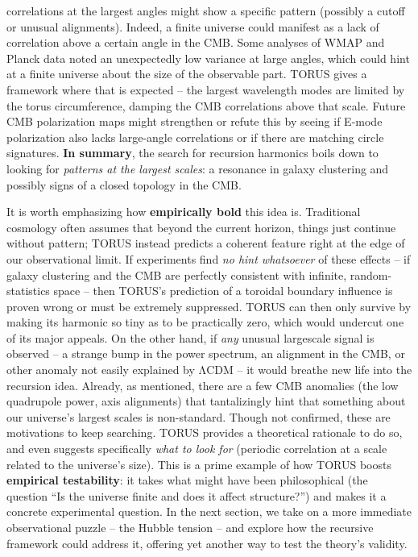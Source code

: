 correlations at the largest angles might show a specific pattern
(possibly a cutoff or unusual alignments). Indeed, a finite universe
could manifest as a lack of correlation above a certain angle in the
CMB. Some analyses of WMAP and Planck data noted an unexpectedly low
variance at large angles, which could hint at a finite universe about
the size of the observable part. TORUS gives a framework where that is
expected -- the largest wavelength modes are limited by the torus
circumference, damping the CMB correlations above that scale. Future CMB
polarization maps might strengthen or refute this by seeing if E-mode
polarization also lacks large-angle correlations or if there are
matching circle signatures. \textbf{In summary}, the search for
recursion harmonics boils down to looking for \emph{patterns at the
largest scales}: a resonance in galaxy clustering and possibly signs of
a closed topology in the CMB.

It is worth emphasizing how \textbf{empirically bold} this idea is.
Traditional cosmology often assumes that beyond the current horizon,
things just continue without pattern; TORUS instead predicts a coherent
feature right at the edge of our observational limit. If experiments
find \emph{no hint whatsoever} of these effects -- if galaxy clustering
and the CMB are perfectly consistent with infinite, random-statistics
space -- then TORUS's prediction of a toroidal boundary influence is
proven wrong or must be extremely suppressed​. TORUS can then only
survive by making its harmonic so tiny as to be practically zero, which
would undercut one of its major appeals. On the other hand, if
\emph{any} unusual largescale signal is observed -- a strange bump in
the power spectrum, an alignment in the CMB, or other anomaly not easily
explained by ΛCDM -- it would breathe new life into the recursion idea.
Already, as mentioned, there are a few CMB anomalies (the low quadrupole
power, axis alignments) that tantalizingly hint that something about our
universe's largest scales is non-standard​. Though not confirmed, these
are motivations to keep searching. TORUS provides a theoretical
rationale to do so, and even suggests specifically \emph{what to look
for} (periodic correlation at a scale related to the universe's size).
This is a prime example of how TORUS boosts \textbf{empirical
testability}: it takes what might have been philosophical (the question
``Is the universe finite and does it affect structure?'') and makes it a
concrete experimental question. In the next section, we take on a more
immediate observational puzzle -- the Hubble tension -- and explore how
the recursive framework could address it, offering yet another way to
test the theory's validity.

